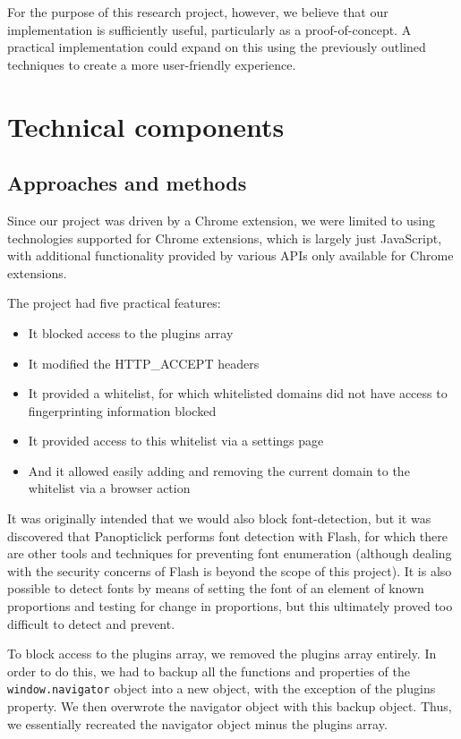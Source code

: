 \documentclass[12pt,a4paper]{article}
\begin{document}
For the purpose of this research project, however, we believe that our implementation is sufficiently useful, particularly as a proof-of-concept. A practical implementation could expand on this using the previously outlined techniques to create a more user-friendly experience.

\section{Technical components}
\subsection{Approaches and methods}
Since our project was driven by a Chrome extension, we were limited to using technologies supported for Chrome extensions, which is largely just JavaScript, with additional functionality provided by various APIs only available for Chrome extensions.

The project had five practical features:
\begin{itemize}
	\item It blocked access to the plugins array
	\item It modified the HTTP\_ACCEPT headers
	\item It provided a whitelist, for which whitelisted domains did not have access to fingerprinting information blocked
	\item It provided access to this whitelist via a settings page
	\item And it allowed easily adding and removing the current domain to the whitelist via a browser action
\end{itemize}

It was originally intended that we would also block font-detection, but it was discovered that Panopticlick performs font detection with Flash, for which there are other tools and techniques for preventing font enumeration (although dealing with the security concerns of Flash is beyond the scope of this project). It is also possible to detect fonts by means of setting the font of an element of known proportions and testing for change in proportions, but this ultimately proved too difficult to detect and prevent.

To block access to the plugins array, we removed the plugins array entirely. In order to do this, we had to backup all the functions and properties of the \texttt{window.navigator} object into a new object, with the exception of the plugins property. We then overwrote the navigator object with this backup object. Thus, we essentially recreated the navigator object minus the plugins array.
\end{document}
